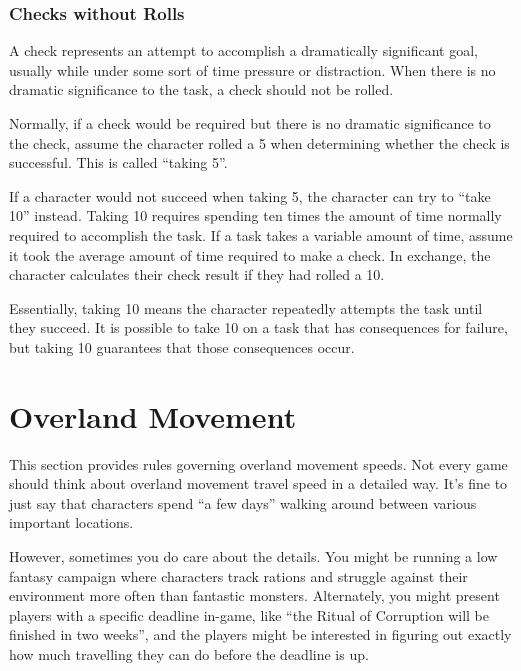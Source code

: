     \subsubsection{Checks without Rolls}
      A check represents an attempt to accomplish a dramatically significant goal, usually while under some sort of time pressure or distraction.
      When there is no dramatic significance to the task, a check should not be rolled.

      Normally, if a check would be required but there is no dramatic significance to the check, assume the character rolled a 5 when determining whether the check is successful.
      This is called ``taking 5''.

      If a character would not succeed when taking 5, the character can try to ``take 10'' instead.
      Taking 10 requires spending ten times the amount of time normally required to accomplish the task.
      If a task takes a variable amount of time, assume it took the average amount of time required to make a check.
      In exchange, the character calculates their check result if they had rolled a 10.

      Essentially, taking 10 means the character repeatedly attempts the task until they succeed.
      It is possible to take 10 on a task that has consequences for failure, but taking 10 guarantees that those consequences occur.

\section{Overland Movement}\label{Overland Movement}

  This section provides rules governing overland movement speeds.
  Not every game should think about overland movement travel speed in a detailed way.
  It's fine to just say that characters spend ``a few days'' walking around between various important locations.

  However, sometimes you do care about the details.
  You might be running a low fantasy campaign where characters track rations and struggle against their environment more often than fantastic monsters.
  Alternately, you might present players with a specific deadline in-game, like ``the Ritual of Corruption will be finished in two weeks'', and the players might be interested in figuring out exactly how much travelling they can do before the deadline is up.


